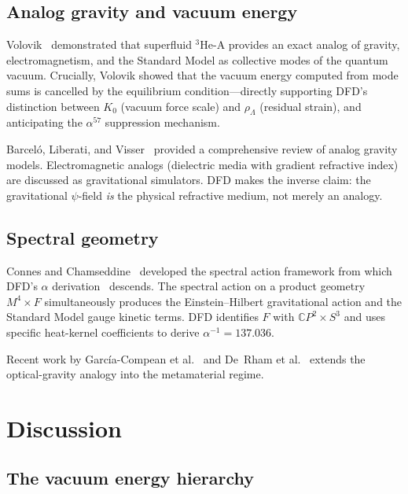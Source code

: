 \documentclass[aps,prd,twocolumn,superscriptaddress,nofootinbib]{revtex4-2}
\newcommand{\CP}{\mathbb{C}P}
\begin{document}
\subsection{Analog gravity and vacuum energy}

Volovik~\cite{Volovik2003} demonstrated that superfluid $^3$He-A
provides an exact analog of gravity, electromagnetism, and the
Standard Model as collective modes of the quantum vacuum.  Crucially,
Volovik showed that the vacuum energy computed from mode sums is
cancelled by the equilibrium condition---directly supporting DFD's
distinction between $K_0$ (vacuum force scale) and $\rho_\Lambda$
(residual strain), and anticipating the $\alpha^{57}$ suppression
mechanism.

Barcel\'{o}, Liberati, and Visser~\cite{Barcelo2011} provided a
comprehensive review of analog gravity models.  Electromagnetic
analogs (dielectric media with gradient refractive index) are
discussed as gravitational simulators.  DFD makes the inverse claim:
the gravitational $\psi$-field \emph{is} the physical refractive
medium, not merely an analogy.

\subsection{Spectral geometry}

Connes and Chamseddine~\cite{Connes1997,Chamseddine2008} developed the
spectral action framework from which DFD's $\alpha$
derivation~\cite{Alcock2025AbInitio} descends.  The spectral action on
a product geometry $M^4 \times F$ simultaneously produces the
Einstein--Hilbert gravitational action and the Standard Model gauge
kinetic terms.  DFD identifies $F$ with $\CP^2 \times S^3$ and uses
specific heat-kernel coefficients to derive $\alpha^{-1} = 137.036$.

Recent work by Garc\'{i}a-Compean et al.~\cite{Garcia2024} and
De~Rham et al.~\cite{DeRham2025} extends the optical-gravity analogy
into the metamaterial regime.


\section{Discussion}
\label{sec:discussion}

\subsection{The vacuum energy hierarchy}
\end{document}
